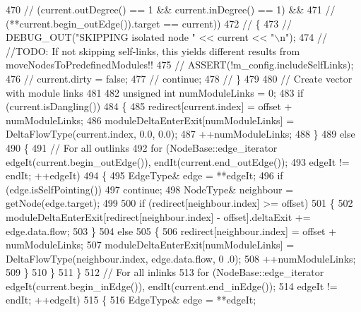 \begin{DoxyCode}
470         \textcolor{comment}{//  (current.outDegree() == 1 && current.inDegree() == 1) &&}
471         \textcolor{comment}{//  (**current.begin\_outEdge()).target == current))}
472         \textcolor{comment}{// \{}
473         \textcolor{comment}{//  DEBUG\_OUT("SKIPPING isolated node " << current << "\(\backslash\)n");}
474         \textcolor{comment}{//  //TODO: If not skipping self-links, this yields different results from
       moveNodesToPredefinedModules!!}
475         \textcolor{comment}{//  ASSERT(!m\_config.includeSelfLinks);}
476         \textcolor{comment}{//  current.dirty = false;}
477         \textcolor{comment}{//  continue;}
478         \textcolor{comment}{// \}}
479 
480         \textcolor{comment}{// Create vector with module links}
481 
482         \textcolor{keywordtype}{unsigned} \textcolor{keywordtype}{int} numModuleLinks = 0;
483         \textcolor{keywordflow}{if} (current.isDangling())
484         \{
485             redirect[current.index] = offset + numModuleLinks;
486             moduleDeltaEnterExit[numModuleLinks] = DeltaFlowType(current.index, 0.0, 0.0);
487             ++numModuleLinks;
488         \}
489         \textcolor{keywordflow}{else}
490         \{
491             \textcolor{comment}{// For all outlinks}
492             \textcolor{keywordflow}{for} (NodeBase::edge\_iterator edgeIt(current.begin\_outEdge()), endIt(current.end\_outEdge());
493                     edgeIt != endIt; ++edgeIt)
494             \{
495                 EdgeType& edge = **edgeIt;
496                 \textcolor{keywordflow}{if} (edge.isSelfPointing())
497                     \textcolor{keywordflow}{continue};
498                 NodeType& neighbour = getNode(edge.target);
499 
500                 \textcolor{keywordflow}{if} (redirect[neighbour.index] >= offset)
501                 \{
502                     moduleDeltaEnterExit[redirect[neighbour.index] - offset].deltaExit += edge.data.flow;
503                 \}
504                 \textcolor{keywordflow}{else}
505                 \{
506                     redirect[neighbour.index] = offset + numModuleLinks;
507                     moduleDeltaEnterExit[numModuleLinks] = DeltaFlowType(neighbour.index, edge.data.flow, 0
      .0);
508                     ++numModuleLinks;
509                 \}
510             \}
511         \}
512         \textcolor{comment}{// For all inlinks}
513         \textcolor{keywordflow}{for} (NodeBase::edge\_iterator edgeIt(current.begin\_inEdge()), endIt(current.end\_inEdge());
514                 edgeIt != endIt; ++edgeIt)
515         \{
516             EdgeType& edge = **edgeIt;

\end{DoxyCode}
